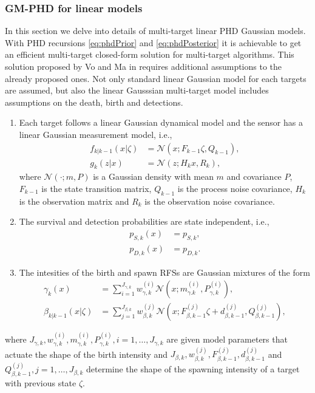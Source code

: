         \subsubsection{GM-PHD for linear models}
In this section we delve into details of multi-target linear PHD Gaussian models. With PHD recursions \eqref{eq:phdPrior} and \eqref{eq:phdPosterior} it is achievable to get an efficient multi-target closed-form solution for multi-target algorithms. This solution proposed by Vo and Ma in \cite{VoMaPHD2006} requires additional assumptions to the already proposed ones. Not only standard linear Gaussian model for each targets are assumed, but also the linear Gausssian multi-target model includes assumptions on the death, birth and detections.
\begin{enumerate}[start=4]
    \item  Each target follows a linear Gaussian dynamical model and the sensor has a linear Gaussian measurement model, i.e., \label{as:phd_4}
        \begin{align}
            f_{k|k-1}(x|\zeta) &= \mathcal{N}(x; F_{k-1}\zeta, Q_{k-1}), \label{eq:phd_linear_model_state}\\
            g_k(z|x) &= \mathcal{N}(z;H_kx, R_k), \label{eq:phd_linear_model_measurements}
        \end{align}
        where $\mathcal{N}(\cdot;m,P)$ is a Gaussian density with mean $m$ and covariance $P$, $F_{k-1}$ is the state transition matrix, $Q_{k-1}$ is the process noise covariance, $H_k$ is the observation matrix and $R_k$ is the observation noise covariance.
    \item The survival and detection probabilities are state independent, i.e., \label{as:phd_5}
        \begin{align}
            p_{S,k}(x) &= p_{S,k}, \label{eq:phd_ps}\\
            p_{D,k}(x) &= p_{D,k}. \label{eq:phd_pd}
        \end{align}
    \item The intesities of the birth and spawn RFSs are Gaussian mixtures of the form \label{as:phd_6}
        \begin{align}
            \gamma_k(x) &= \sum_{i=1}^{J_{\gamma,k}}w_{\gamma,k}^{(i)} \mathcal{N}(x; m_{\gamma.k}^{(i)}, P_{\gamma,k}^{(i)}), \label{eq:phd_birth_intensity} \\
            \beta_{k|k-1}(x|\zeta) &= \sum_{j=1}^{J_{\beta,k}} w_{\beta,k}^{(j)} \mathcal{N}(x;F_{\beta,k-1}^{(j)}\zeta + d_{\beta,k-1}^{(j)}, Q_{\beta,k-1}^{(j)}), \label{eq:phd_spawning_intensity}
        \end{align}
\end{enumerate}
where $J_{\gamma,k}, w_{\gamma,k}^{(i)}, m_{\gamma,k}^{(i)}, P_{\gamma,k}^{(i)}, i=1,\dots, J_{\gamma,k}$ are given model parameters that actuate the shape of the birth intensity and $J_{\beta,k}, w_{\beta,k}^{(j)}, F_{\beta,k-1}^{(j)}, d_{\beta,k-1}^{(j)}$ and $Q_{\beta,k-1}^{(j)}, j=1,\dots, J_{\beta,k}$ determine the shape of the spawning intensity of a target with previous state $\zeta$.

